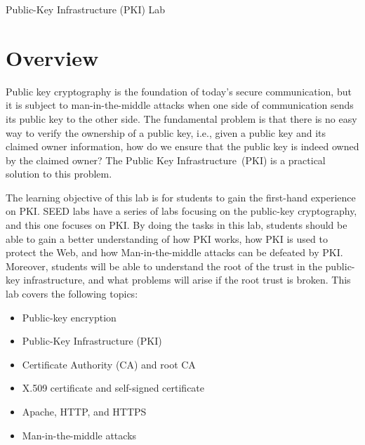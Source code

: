 



\newcommand{\pkiFigs}{./Figs}

\newcommand{\OpenSSL} {\texttt{OpenSSL}\xspace}
\newcommand{\pkiserver}{\texttt{SEEDPKILab2020.com}\xspace} 





\begin{center}
{\LARGE Public-Key Infrastructure (PKI) Lab}
\end{center}




\section{Overview}



Public key cryptography is the foundation of today's secure
communication, but it is subject
to man-in-the-middle attacks when one side of communication sends its
public key to the other side.  The fundamental problem is
that there is no easy way to verify the ownership of a public key, i.e., given a public key and
its claimed owner information, how do we ensure that the public key is indeed owned by
the claimed owner? The Public Key Infrastructure~(PKI) is a practical solution
to this problem.


The learning objective of this lab is for students to gain the first-hand 
experience on PKI. SEED labs have a series of labs focusing on the public-key cryptography, and 
this one focuses on PKI. By doing the tasks in this lab, students should be able to gain a 
better understanding of how PKI works, how PKI is used to protect the Web, and
how Man-in-the-middle attacks can be defeated by PKI. Moreover, students will be able to
understand the root of the trust in the public-key infrastructure, and what problems 
will arise if the root trust is broken.  This lab covers the following topics:

\begin{itemize}[noitemsep]
\item Public-key encryption
\item Public-Key Infrastructure (PKI)
\item Certificate Authority (CA) and root CA 
\item X.509 certificate and self-signed certificate
\item Apache, HTTP, and HTTPS
\item Man-in-the-middle attacks
\end{itemize}



